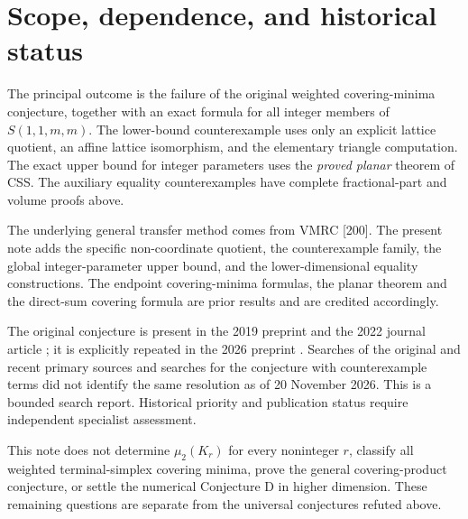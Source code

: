 \documentclass[11pt,a4paper]{article}
\theoremstyle{remark}
\begin{document}
\section{Scope, dependence, and historical status}
The principal outcome is the failure of the original weighted
covering-minima conjecture, together with an exact formula for all
integer members of $S(1,1,m,m)$. The lower-bound counterexample uses
only an explicit lattice quotient, an affine lattice isomorphism,
and the elementary triangle computation. The exact upper bound for
integer parameters uses the \emph{proved planar} theorem of CSS.
The auxiliary equality counterexamples have complete fractional-part
and volume proofs above.

The underlying general transfer method comes from VMRC [200].
The present note adds the specific non-coordinate quotient, the
counterexample family, the global integer-parameter upper bound,
and the lower-dimensional equality constructions. The endpoint
covering-minima formulas, the planar theorem and the direct-sum
covering formula are prior results and are credited accordingly.

The original conjecture is present in the 2019 preprint and the
2022 journal article \cite{CSS}; it is explicitly repeated in the
2026 preprint \cite{Krivokuca}. Searches of the original and recent
primary sources and searches for the conjecture with counterexample
terms did not identify the same resolution as of 20 November 2026.
This is a bounded search report. Historical priority and publication
status require independent specialist assessment.

This note does not determine $\mu_2(K_r)$ for every noninteger $r$,
classify all weighted terminal-simplex covering minima, prove the
general covering-product conjecture, or settle the numerical
Conjecture D in higher dimension. These remaining questions are
separate from the universal conjectures refuted above.

\appendix
\end{document}
